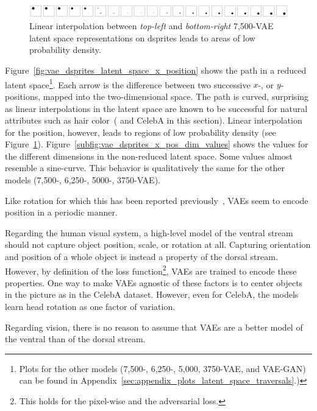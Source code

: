 \begin{figure}
    \centering
    \includegraphics[width=\textwidth]{images/latent_space_traversals/vae_dsprites_7500_position.png}
    \caption{Linear interpolation between \textit{top-left} and \textit{bottom-right} 7,500-\ac{VAE} latent space representations on dsprites leads to areas of low probability density.}
    \label{fig:vae_7500_dsprites_position_interpolation}
\end{figure}

Figure~\ref{fig:vae_dsprites_latent_space_x_position} shows the path in a reduced latent space\footnote{Plots for the other models (7,500-, 6,250-, 5,000, 3750-\ac{VAE}, and \ac{VAE}-\ac{GAN}) can be found in Appendix~\ref{sec:appendix_plots_latent_space_traversals}.)}.
Each arrow is the difference between two successive $x$-, or $y$-positions, mapped into the two-dimensional space.
The path is curved, surprising as linear interpolations in the latent space are known to be successful for natural attributes such as hair color~(\citep{radford2016deep} and CelebA in this section).
Linear interpolation for the position, however, leads to regions of low probability density (see Figure~\ref{fig:vae_7500_dsprites_position_interpolation}).
Figure~\ref{subfig:vae_dsprites_x_pos_dim_values} shows the values for the different dimensions in the non-reduced latent space.
Some values almost resemble a sine-curve.
This behavior is qualitatively the same for the other models (7,500-, 6,250-, 5000-, 3750-\ac{VAE}).

Like rotation for which this has been reported previously~\citep{chen2018isolating}, \acp{VAE} seem to encode position in a periodic manner.

Regarding the human visual system, a high-level model of the ventral stream should not capture object position, scale, or rotation at all.
Capturing orientation and position of a whole object is instead a property of the dorsal stream.
However, by definition of the loss function\footnote{This holds for the pixel-wise and the adversarial loss.}, \acp{VAE} are trained to encode these properties.
One way to make \acp{VAE} agnostic of these factors is to center objects in the picture as in the CelebA dataset.
However, even for CelebA, the models learn head rotation as one factor of variation.

Regarding vision, there is no reason to assume that \acp{VAE} are a better model of the ventral than of the dorsal stream.

